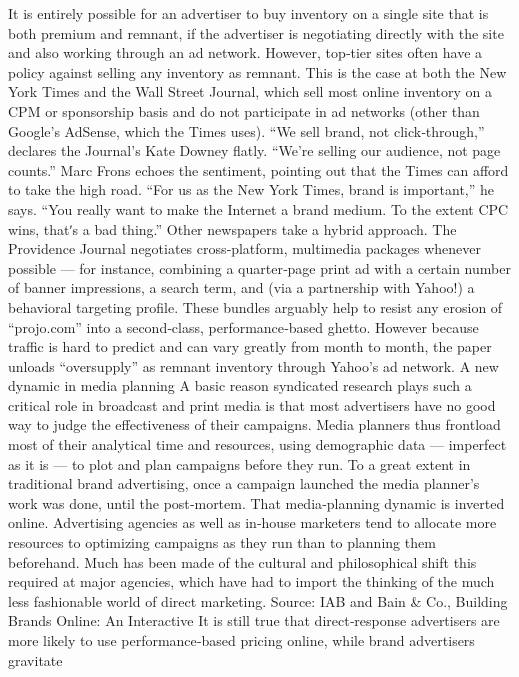 It is entirely possible for an advertiser to buy inventory on a single site
that is both premium and remnant, if the advertiser is negotiating directly
with the site and also working through an ad network. However, top‐tier
sites often have a policy against selling any inventory as remnant.
This is the case at both the New York Times and the Wall Street Journal,
which sell most online inventory on a CPM or sponsorship basis and do
not participate in ad networks (other than Google’s AdSense, which the
Times uses). ``We sell brand, not click‐through,'' declares the Journal’s Kate
Downey flatly. ``We’re selling our audience, not page counts.''
Marc Frons echoes the sentiment, pointing out that the Times can afford to
take the high road. ``For us as the New York Times, brand is important,'' he
says. ``You really want to make the Internet a brand medium. To the
extent CPC wins, thatʹs a bad thing.''
Other newspapers take a hybrid approach. The Providence Journal
negotiates cross‐platform, multimedia packages whenever possible — for
instance, combining a quarter‐page print ad with a certain number of
banner impressions, a search term, and (via a partnership with Yahoo!) a
behavioral targeting profile. These bundles arguably help to resist any
erosion of ``projo.com'' into a second‐class, performance‐based ghetto.
However because traffic is hard to predict and can vary greatly from
month to month, the paper unloads ``oversupply'' as remnant inventory
through Yahoo’s ad network.
A new dynamic in media planning
A basic reason syndicated research plays such a critical role in broadcast
and print media is that most advertisers have no good way to judge the
effectiveness of their campaigns. Media planners thus frontload most of
their analytical time and resources, using demographic data — imperfect
as it is — to plot and plan campaigns before they run. To a great extent in
traditional brand advertising, once a campaign launched the media
planner’s work was done, until the post‐mortem.
That media‐planning dynamic is inverted online. Advertising agencies as
well as in‐house marketers tend to allocate more resources to optimizing
campaigns as they run than to planning them beforehand. Much has been
made of the cultural and philosophical shift this required at major
agencies, which have had to import the thinking of the much less
fashionable world of direct marketing.
Source: IAB and Bain & Co., Building Brands Online: An Interactive
It is still true that direct‐response advertisers are more likely to use
performance‐based pricing online, while brand advertisers gravitate
